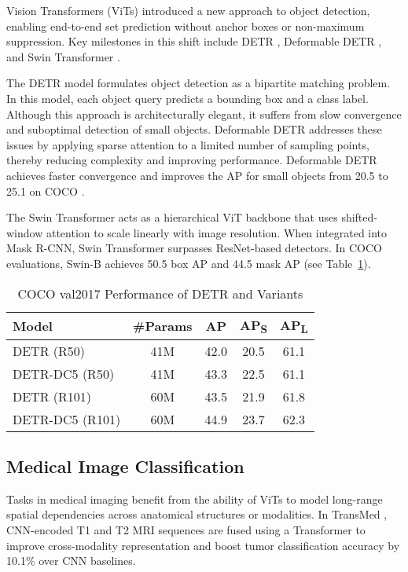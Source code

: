 \documentclass[conference]{IEEEtran}
\begin{document}
Vision Transformers (ViTs) introduced a new approach to object detection, enabling end-to-end set prediction without anchor boxes or non-maximum suppression. Key milestones in this shift include DETR \cite{Carion2020endtoend}, Deformable DETR \cite{zhu2021deformable}, and Swin Transformer \cite{liu2021swin}.

The DETR model formulates object detection as a bipartite matching problem. In this model, each object query predicts a bounding box and a class label. Although this approach is architecturally elegant, it suffers from slow convergence and suboptimal detection of small objects. Deformable DETR addresses these issues by applying sparse attention to a limited number of sampling points, thereby reducing complexity and improving performance. Deformable DETR achieves faster convergence and improves the AP for small objects from 20.5 to 25.1 on COCO \cite{zhu2021deformable}.

The Swin Transformer acts as a hierarchical ViT backbone that uses shifted-window attention to scale linearly with image resolution. When integrated into Mask R-CNN, Swin Transformer surpasses ResNet-based detectors. In COCO evaluations, Swin-B achieves 50.5 box AP and 44.5 mask AP \cite{liu2021swin} (see Table~\ref{tab:object}).

\begin{table}[ht]
\caption{COCO val2017 Performance of DETR and Variants \cite{Carion2020endtoend}}
\label{tab:object}
\centering
\begin{tabular}{lcccc}
\toprule
\textbf{Model} & \textbf{\#Params} & \textbf{AP} & \textbf{AP\textsubscript{S}} & \textbf{AP\textsubscript{L}} \\
\midrule
DETR (R50) & 41M & 42.0 & 20.5 & 61.1 \\
DETR-DC5 (R50) & 41M & 43.3 & 22.5 & 61.1 \\
DETR (R101) & 60M & 43.5 & 21.9 & 61.8 \\
DETR-DC5 (R101) & 60M & 44.9 & 23.7 & 62.3 \\
\bottomrule
\end{tabular}
\end{table}


\subsection{Medical Image Classification}

Tasks in medical imaging benefit from the ability of ViTs to model long-range spatial dependencies across anatomical structures or modalities. In TransMed \cite{dai2021transmed}, CNN-encoded T1 and T2 MRI sequences are fused using a Transformer to improve cross-modality representation and boost tumor classification accuracy by 10.1\% over CNN baselines.
\end{document}
